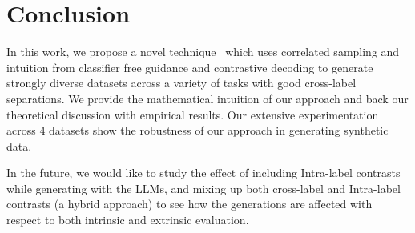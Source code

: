 \section{Conclusion}
In this work, we propose a novel technique \corrsyn\ which uses correlated sampling and intuition from classifier free guidance and contrastive decoding to generate strongly diverse datasets across a variety of tasks with good cross-label separations. We provide the mathematical intuition of our approach and back our theoretical discussion with empirical results. Our extensive experimentation across 4 datasets show the robustness of our approach in generating synthetic data. 

In the future, we would like to study the effect of including Intra-label contrasts while generating with the LLMs, and mixing up both cross-label and Intra-label contrasts (a hybrid approach) to see how the generations are affected with respect to both intrinsic and extrinsic evaluation.